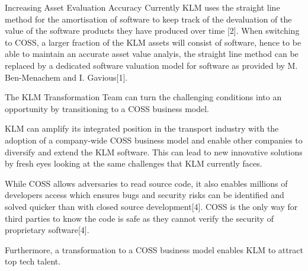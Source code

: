 \documentclass[portrait,a0paper]{rudi-poster}  %
\begin{document}
\begin{rudiblockimethodsresultsbody}
    \begin{rudisubblock}{\hsize}{Increasing Asset Evaluation Accuracy}
    	Currently KLM uses the straight line method for the amortisation of software to keep track of the devaluation of the value of the software products they have produced over time [2]. When switching to COSS, a larger fraction of the KLM assets will consist of software, hence to be able to maintain an accurate asset value analyis, the straight line method can be replaced by a dedicated software valuation model for software as provided by M. Ben-Menachem and I. Gavious[1].
    \end{rudisubblock}
\end{rudiblockimethodsresultsbody}


\begin{rudiblockconclusion}
    \begin{multicols}{3}
        The KLM Transformation Team can turn the challenging conditions into an opportunity by transitioning to a COSS business model.
        
        KLM can amplify its integrated position in the transport industry with the adoption of a company-wide COSS business model and enable other companies to diversify and extend the KLM software. This can lead to new innovative solutions by fresh eyes looking at the same challenges that KLM currently faces.
        
        While COSS allows adversaries to read source code, it also enables millions of developers access which ensures bugs and security risks can be identified and solved quicker than with closed source development[4]. COSS is the only way for third parties to know the code is safe as they cannot verify the security of proprietary software[4].
        
        Furthermore, a transformation to a COSS business model enables KLM to attract top tech talent.
        
        
    \end{multicols}
\end{rudiblockconclusion}
\end{document}
